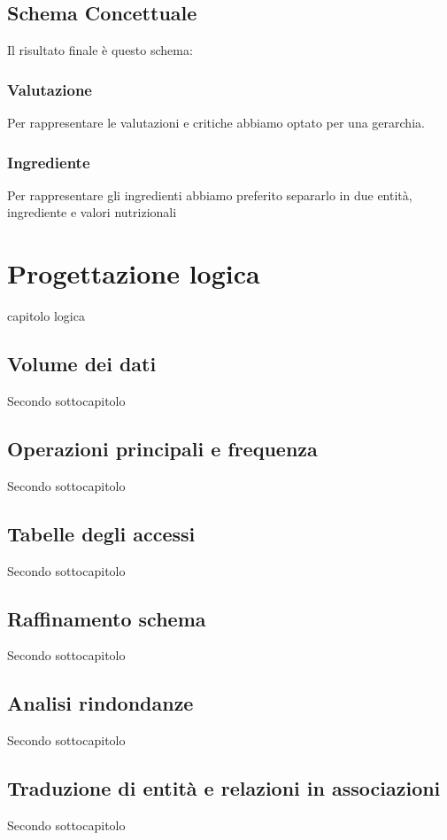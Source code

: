 ﻿\documentclass[a4paper,12pt]{report}
\begin{document}
\section{Schema Concettuale}
Il risultato finale è questo schema:
\begin{figure}[H]
    \centering
    \label{fig:enter-label}
\end{figure}

\subsection{Valutazione}
Per rappresentare le valutazioni e critiche
abbiamo optato per una gerarchia.
\begin{figure}[H]
    \centering
    \label{fig:enter-label}
\end{figure}
\subsection{Ingrediente}
Per rappresentare gli ingredienti abbiamo preferito separarlo in due entità, ingrediente e valori nutrizionali
\chapter{Progettazione logica}
capitolo logica
\section{Volume dei dati}
Secondo sottocapitolo
\section{Operazioni principali e frequenza}
Secondo sottocapitolo
\section{Tabelle degli accessi}
Secondo sottocapitolo
\section{Raffinamento schema}
Secondo sottocapitolo
\section{Analisi rindondanze}
Secondo sottocapitolo
\section{Traduzione di entità e relazioni in associazioni}
Secondo sottocapitolo
\end{document}
